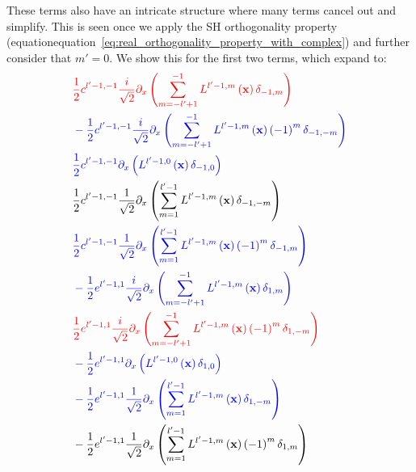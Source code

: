 These terms also have an intricate structure where many terms cancel out and simplify. This is seen once we apply the SH orthogonality property (equationequation~\ref{eq:real_orthogonality_property_with_complex}) and further consider that $m'=0$. We show this for the first two terms, which expand to:
\begin{align*}
&
\mathcolor{red}
{
\frac{1}{2}c^{{l'-1,-1}}\frac{i}{\sqrt{2}}\partial_x\left(\sum_{m=-l'+1}^{-1}{L^{{l'-1,m}}\left (\vec{x} \right )\delta_{-1,m}}\right)
}
\\&
\mathcolor{blue}
{
-\frac{1}{2}c^{{l'-1,-1}}\frac{i}{\sqrt{2}}\partial_x\left(\sum_{m=-l'+1}^{-1}{L^{{l'-1,m}}\left (\vec{x} \right )\left({-1}\right)^{m}\delta_{-1,-m}}\right)
}
\\&
\mathcolor{blue}
{
\frac{1}{2}c^{{l'-1,-1}}\partial_x\left(L^{{l'-1,0}}\left (\vec{x} \right )\delta_{-1,0}\right)
}
\\&
\frac{1}{2}c^{{l'-1,-1}}\frac{1}{\sqrt{2}}\partial_x\left(\sum_{m=1}^{l'-1}{L^{{l'-1,m}}\left (\vec{x} \right )\delta_{-1,-m}}\right)
\\&
\mathcolor{blue}
{
\frac{1}{2}c^{{l'-1,-1}}\frac{1}{\sqrt{2}}\partial_x\left(\sum_{m=1}^{l'-1}{L^{{l'-1,m}}\left (\vec{x} \right )\left({-1}\right)^{m}\delta_{-1,m}}\right)
}
\\&
\mathcolor{blue}
{
-\frac{1}{2}e^{{l'-1,1}}\frac{i}{\sqrt{2}}\partial_x\left(\sum_{m=-l'+1}^{-1}{L^{{l'-1,m}}\left (\vec{x} \right )\delta_{1,m}}\right)
}
\\&
\mathcolor{red}
{
\frac{1}{2}e^{{l'-1,1}}\frac{i}{\sqrt{2}}\partial_x\left(\sum_{m=-l'+1}^{-1}{L^{{l'-1,m}}\left (\vec{x} \right )\left({-1}\right)^{m}\delta_{1,-m}}\right)
}
\\&
\mathcolor{blue}
{
-\frac{1}{2}e^{{l'-1,1}}\partial_x\left(L^{{l'-1,0}}\left (\vec{x} \right )\delta_{1,0}\right)
}
\\&
\mathcolor{blue}
{
-\frac{1}{2}e^{{l'-1,1}}\frac{1}{\sqrt{2}}\partial_x\left(\sum_{m=1}^{l'-1}{L^{{l'-1,m}}\left (\vec{x} \right )\delta_{1,-m}}\right)
}
\\&
-\frac{1}{2}e^{{l'-1,1}}\frac{1}{\sqrt{2}}\partial_x\left(\sum_{m=1}^{l'-1}{L^{{l'-1,m}}\left (\vec{x} \right )\left({-1}\right)^{m}\delta_{1,m}}\right)
\end{align*}

